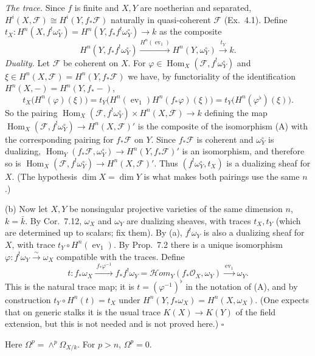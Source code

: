\documentclass[11pt]{article}
\begin{document}
\emph{The trace.} Since $f$ is finite and $X,Y$ are noetherian and separated, $H^i(X,\mathcal F)\cong H^i(Y,f_*\mathcal F)$ naturally in quasi-coherent $\mathcal F$ (Ex.~4.1). Define $t_X\colon H^n(X,f^!\omega^\circ_Y)=H^n(Y,f_*f^!\omega_Y^\circ)\to k$ as the composite
\[
H^n(Y,f_*f^!\omega^\circ_Y)\xrightarrow{H^n(\operatorname{ev}_1)}H^n(Y,\omega^\circ_Y)\xrightarrow{\ t_Y\ }k .
\]
\emph{Duality.} Let $\mathcal F$ be coherent on $X$. For $\varphi\in\operatorname{Hom}_X(\mathcal F,f^!\omega_Y^\circ)$ and $\xi\in H^n(X,\mathcal F)=H^n(Y,f_*\mathcal F)$ we have, by functoriality of the identification $H^n(X,-)=H^n(Y,f_*-)$,
\[
t_X\big(H^n(\varphi)(\xi)\big)=t_Y\big(H^n(\operatorname{ev}_1)H^n(f_*\varphi)(\xi)\big)=t_Y\big(H^n(\varphi^\flat)(\xi)\big).
\]
So the pairing $\operatorname{Hom}_X(\mathcal F,f^!\omega^\circ_Y)\times H^n(X,\mathcal F)\to k$ defining the map $\operatorname{Hom}_X(\mathcal F,f^!\omega_Y^\circ)\to H^n(X,\mathcal F)'$ is the composite of the isomorphism (A) with the corresponding pairing for $f_*\mathcal F$ on $Y$. Since $f_*\mathcal F$ is coherent and $\omega_Y^\circ$ is dualizing, $\operatorname{Hom}_Y(f_*\mathcal F,\omega_Y^\circ)\to H^n(Y,f_*\mathcal F)'$ is an isomorphism, and therefore so is $\operatorname{Hom}_X(\mathcal F,f^!\omega_Y^\circ)\to H^n(X,\mathcal F)'$. Thus $(f^!\omega^\circ_Y,t_X)$ is a dualizing sheaf for $X$. (The hypothesis $\dim X=\dim Y$ is what makes both pairings use the same $n$.)

(b) Now let $X,Y$ be nonsingular projective varieties of the same dimension $n$, $k=\bar k$. By Cor.~7.12, $\omega_X$ and $\omega_Y$ are dualizing sheaves, with traces $t_X,t_Y$ (which are determined up to scalars; fix them). By (a), $f^!\omega_Y$ is also a dualizing sheaf for $X$, with trace $t_Y\circ H^n(\operatorname{ev}_1)$. By Prop.~7.2 there is a unique isomorphism $\varphi\colon f^!\omega_Y\xrightarrow{\sim}\omega_X$ compatible with the traces. Define
\[
t\colon f_*\omega_X\xrightarrow{\ f_*\varphi^{-1}\ }f_*f^!\omega_Y=\mathcal Hom_Y(f_*\mathcal O_X,\omega_Y)\xrightarrow{\ \operatorname{ev}_1\ }\omega_Y .
\]
This is the natural trace map; it is $t=(\varphi^{-1})^\flat$ in the notation of (A), and by construction $t_Y\circ H^n(t)=t_X$ under $H^n(Y,f_*\omega_X)=H^n(X,\omega_X)$. (One expects that on generic stalks it is the usual trace $K(X)\to K(Y)$ of the field extension, but this is not needed and is not proved here.)
\hfill$\square$

\pf
Here $\Omega^p=\wedge^p\Omega_{X/k}$. For $p>n$, $\Omega^p=0$.
\end{document}
